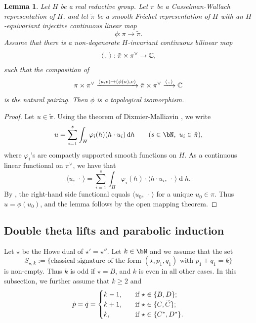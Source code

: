 \documentclass[11pt,a4paper]{amsart}
\newcommand{\od}{\operatorname{d}}
\newcommand{\la}{\langle}
\newcommand{\ra}{\rangle}
\newcommand{\be}{\begin {equation}}
\newcommand{\ee}{\end {equation}}
\numberwithin{equation}{section}
\newtheorem{lem}[thm]{Lemma}
\theoremstyle{remark}
\begin{document}
\begin{lem}\label{imb2}
Let $H$ be a real reductive group. Let $\pi$ be a Casselman-Wallach representation of $H$, and let $\tilde \pi$ be a smooth Fr\'echet representation of $H$ with an $H$-equivariant injective continuous linear map
\[
  \phi: \pi\rightarrow \tilde \pi.
\]
Assume that  there is a non-degenerate $H$-invariant continuous bilinear map
\[
\la\,,\,\ra: \tilde \pi\times \pi^\vee\rightarrow \C,
\]
such that the composition of
\[
 \pi\times \pi^\vee\xrightarrow{(u,v)\mapsto (\phi(u),v)} \tilde \pi\times \pi^\vee\xrightarrow{\la\,,\,\ra} \C
\]
is the natural pairing. Then $\phi$ is a topological isomorphism.
\end{lem}
\begin{proof}
 Let $u\in \tilde \pi$.
 Using the theorem of Dixmier-Malliavin \cite[Theorem 3.3]{DM}, we write
 \[
   u=\sum_{i=1}^{s} \int_H \varphi_i(h) ( h\cdot u_i)\od\! h \qquad (s\in \bN, \ u_i\in\tilde \pi),
 \]
 where $\varphi_i$'s are compactly supported smooth functions on $H$.  As a continuous linear functional on $\pi^\vee$, we have that
  \[
   \la u,\, \cdot\, \ra=\sum_{i=1}^{s} \int_H \varphi_i(h)  \cdot \la h\cdot u_i, \,\cdot\,\ra \od\! h.
 \]
By \cite[Lemma 3.5]{SZ1},  the right-hand side  functional  equals  $\la u_0, \,\cdot\,\ra$ for a unique $u_0\in \pi$. Thus $u=\phi(u_0)$, and the lemma follows by the open mapping theorem.
\end{proof}



\subsection{Double theta lifts and parabolic induction}\label{doublep}
Let $\star$ be the Howe dual of $\star'=\star''$. Let $k\in \bN$ and we assume that the set
\be\label{sstark}
 S_{\star, k}:=\{\textrm{classical signature of the form $(\star, p_1,q_1)$ with $p_1+q_1=k$}\}
\ee
is non-empty. Thus $k$ is odd if $\star=B$, and $k$ is even in all other cases.
In this subsection, we further assume that $k\geq 2$ and
\be\label{dotp}
 \dot p=\dot q= \begin{cases}
 k-1,  &\quad \textrm{if } \star\in \{B,D\};\\
k+1,  &\quad  \textrm{if $\star\in \{C, \widetilde C\}$;}\\
k, & \quad  \textrm{if $ \star\in\{C^*,D^*\}$.}
\end{cases}
 \ee
\end{document}
